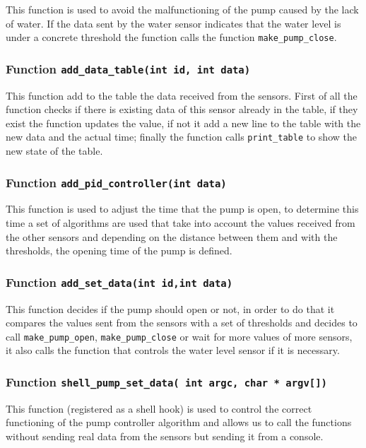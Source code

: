 \documentclass[11pt,paper=a4,parskip=half]{scrartcl}
\begin{document}
This function is used to avoid the malfunctioning of the pump caused by the
lack of water. If the data sent by the water sensor indicates that the water
level is under a concrete threshold the function calls the function
\texttt{make\_pump\_close}.

\subsubsection{Function \texttt{add\_data\_table(int id, int data)}}

This function add to the table the data received from the sensors. First of all the function checks if there is existing data of this sensor already in the table, if they exist the function updates the value, if not it add a new line to the table with the new data and the actual time; finally the function calls \verb`print_table` to show the new state of the table.

\subsubsection{Function \texttt{add\_pid\_controller(int data)}}

This function is used to adjust the time that the pump is open, to determine
this time a set of algorithms are used that take into account the values
received from the other sensors and depending on the distance between
them and with the thresholds, the opening time of the pump is defined.

\subsubsection{Function \texttt{add\_set\_data(int id,int data)}}

This function decides if the pump should open or not, in order to do that it
compares the values sent from the sensors with a set of thresholds and
decides to call \texttt{make\_pump\_open}, \texttt{make\_pump\_close} or wait
for more values of more sensors, it also calls the function that controls the
water level sensor if it is necessary.

\subsubsection{Function \texttt{shell\_pump\_set\_data( int argc, char * argv[])}}

This function (registered as a shell hook) is used to control the correct
functioning of the pump controller algorithm and allows us to call the
functions without sending real data from the sensors but sending it from a console.
\end{document}
